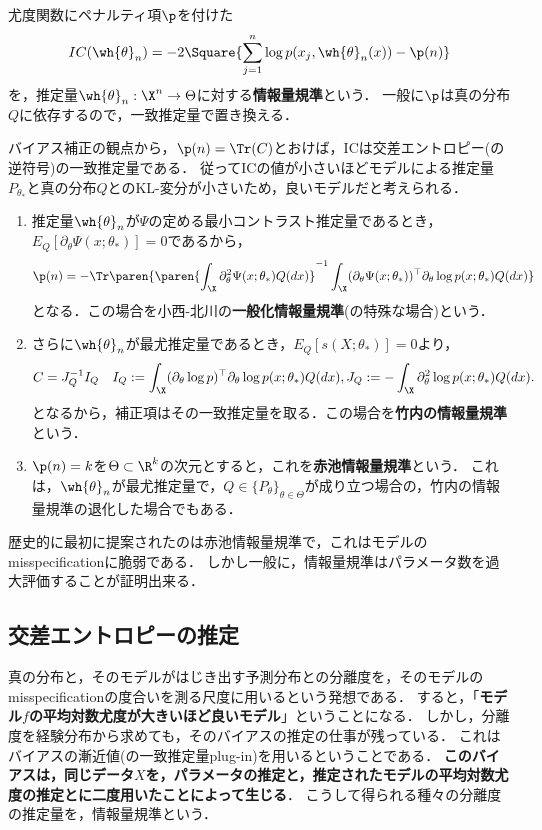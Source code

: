 \documentclass[uplatex,dvipdfmx]{jsreport}
\begin{document}
\begin{definition}
    尤度関数にペナルティ項$\p$を付けた
    \[IC(\wh{\theta}_n)=-2\Square{\sum^n_{j=1}\log p(x_j,\wh{\theta}_n(x))-\p(n)}\]
    を，推定量$\wh{\theta}_n:\X^n\to\Theta$に対する\textbf{情報量規準}という．
    一般に$\p$は真の分布$Q$に依存するので，一致推定量で置き換える．
\end{definition}

\begin{example}
    バイアス補正の観点から，$\p(n)=\Tr(C)$とおけば，ICは交差エントロピー(の逆符号)の一致推定量である．
    従ってICの値が小さいほどモデルによる推定量$P_{\theta_*}$と真の分布$Q$とのKL-変分が小さいため，良いモデルだと考えられる．
    \begin{enumerate}
        \item 推定量$\wh{\theta}_n$が$\Psi$の定める最小コントラスト推定量であるとき，$E_Q[\partial_\theta\Psi(x;\theta_*)]=0$であるから，
        \[\p(n)=-\Tr\paren{\paren{\int_\X\partial^2_\theta\Psi(x;\theta_*)Q(dx)}^{-1}\int_\X(\partial_\theta\Psi(x;\theta_*))^\top\partial_\theta\log p(x;\theta_*)Q(dx)}\]
        となる．この場合を小西-北川の\textbf{一般化情報量規準}(の特殊な場合)という．
        \item さらに$\wh{\theta}_n$が最尤推定量であるとき，$E_Q[s(X;\theta_*)]=0$より，
        \[C=J_Q^{-1}I_Q\quad I_Q:=\int_\X(\partial_\theta\log p)^\top\partial_\theta\log p(x;\theta_*)Q(dx),J_Q:=-\int_\X\partial^2_\theta\log p(x;\theta_*)Q(dx).\]
        となるから，補正項はその一致推定量を取る．この場合を\textbf{竹内の情報量規準}という．
        \item $\p(n)=k$を$\Theta\subset\R^k$の次元とすると，これを\textbf{赤池情報量規準}という．
        これは，$\wh{\theta}_n$が最尤推定量で，$Q\in\{P_\theta\}_{\theta\in\Theta}$が成り立つ場合の，竹内の情報量規準の退化した場合でもある．
    \end{enumerate}
    歴史的に最初に提案されたのは赤池情報量規準で，これはモデルのmisspecificationに脆弱である．
    しかし一般に，情報量規準はパラメータ数を過大評価することが証明出来る．
\end{example}

\subsection{交差エントロピーの推定}

\begin{tcolorbox}[colframe=ForestGreen, colback=ForestGreen!10!white,breakable,colbacktitle=ForestGreen!40!white,coltitle=black,fonttitle=\bfseries\sffamily,
title=]
    真の分布と，そのモデルがはじき出す予測分布との分離度を，そのモデルのmisspecificationの度合いを測る尺度に用いるという発想である．
    すると，「\textbf{モデル$f$の平均対数尤度が大きいほど良いモデル}」ということになる．
    しかし，分離度を経験分布から求めても，そのバイアスの推定の仕事が残っている．
    これはバイアスの漸近値(の一致推定量plug-in)を用いるということである．
    \textbf{このバイアスは，同じデータ$X$を，パラメータの推定と，推定されたモデルの平均対数尤度の推定とに二度用いたことによって生じる}．
    こうして得られる種々の分離度の推定量を，情報量規準という．
\end{tcolorbox}
\end{document}

